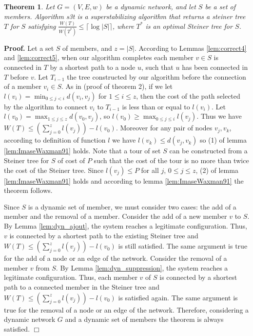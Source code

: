 \documentclass[11pt]{article}
\newtheorem{theorem}{Theorem}
\newenvironment{proof}{\noindent \begin{rm}{\textbf{Proof.} }}{\hspace*{\fill}$\Box$\par\end{rm} \vspace{.3cm}}
\newcommand{\STT}{{\sc s3t}}
\begin{document}
\begin{theorem}\label{theo1}
Let $G=(V,E,w)$ be a dynamic network, and let $S$ be a set of members. Algorithm \STT\/ is a superstabilizing algorithm that returns a steiner tree $T$ for $S$ satisfying
$\frac{W(T)}{W(T^*)} \leq \lceil \log |S| \rceil$,  where $T^*$ is an optimal Steiner tree for $S$.
\end{theorem}

\begin{proof}
Let a set $S$ of members, and $z=|S|$. According to Lemmas \ref{lem:correct4} and \ref{lem:correct5}, when our algorithm completes each member $v \in S$ is connected in $T$ by a shortest path to a node $u$, such that $u$ has been connected in $T$ before $v$. Let $T_{i-1}$ the tree constructed by our algorithm before the connection of a member $v_i \in S$. As in \cite{ImaseWaxman91} (proof of theorem 2), if we let $l(v_i)= \min_{0 \leq j < i} d(v_i,v_j)$ for $1 \leq i \leq z$, then the cost of the path selected by the algorithm to connect $v_i$ to $T_{i-1}$ is less than or equal to $l(v_i)$. Let $l(v_0)=\max_{1 \leq j \leq z} d(v_0,v_j)$, so $l(v_0) \geq \max_{0 \leq j \leq i} l(v_j)$. Thus we have $W(T) \leq (\sum_{j=0}^{z} l(v_j))-l(v_0)$. Moreover for any pair of nodes $v_j,v_k$, according to definition of function $l$ we have $l(v_k) \leq d(v_j,v_k)$ so (1) of lemma \ref{lem:ImaseWaxman91} holds. Note that a tour of set $S$ can be constructed from a Steiner tree for $S$ of cost of $P$ such that the cost of the tour is no more than twice the cost of the Steiner tree. Since $l(v_j) \leq P$ for all $j$, $0 \leq j \leq z$, (2) of lemma \ref{lem:ImaseWaxman91} holds and according to lemma \ref{lem:ImaseWaxman91} the theorem follows.

Since $S$ is a dynamic set of member, we must consider two cases: the add of a member and the removal of a member. Consider the add of a new member $v$ to $S$. By Lemma \ref{lem:dyn_ajout}, the system reaches a legitimate configuration. Thus, $v$ is connected by a shortest path to the existing Steiner tree and $W(T) \leq (\sum_{j=0}^{z} l(v_j))-l(v_0)$ is still satisfied. The same argument is true for the add of a node or an edge of the network. Consider the removal of a member $v$ from $S$. By Lemma \ref{lem:dyn_suppression}, the system reaches a legitimate configuration. Thus, each member $v$ of $S$ is connected by a shortest path to a connected member in the Steiner tree and $W(T) \leq (\sum_{j=0}^{z} l(v_j))-l(v_0)$ is satisfied again. The same argument is true for the removal of a node or an edge of the network. Therefore, considering a dynamic network $G$ and a dynamic set of members the theorem is always satisfied.
\end{proof}
\end{document}
